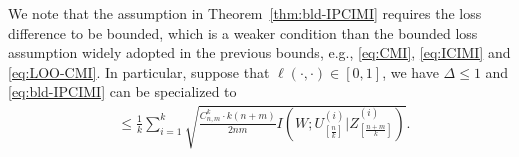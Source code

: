 \documentclass[onecolumn,romanappendices,10pt]{IEEEtran}
\newtheorem{remark}{Remark}
\newcommand{\EE}{{\mathbb{E}}}
\DeclareMathOperator{\gen}{\overline{gen}}
\begin{document}
	
	We note that the assumption in Theorem~\ref{thm:bld-IPCIMI} requires the loss difference to be bounded, which is a weaker condition than the bounded loss assumption widely adopted in the previous bounds, e.g., \eqref{eq:CMI}, \eqref{eq:ICIMI} and \eqref{eq:LOO-CMI}. In particular, suppose that $\ell(\cdot, \cdot) \in [0,1]$, we have $\Delta \leq 1$ and \eqref{eq:bld-IPCIMI} can be specialized to
	\begin{equation}
		\begin{aligned}
			\gen \leq \frac{1}{k} \sum_{i=1}^{k} \sqrt{\frac{C^k_{n,m} \cdot k(n+m)}{2nm} I\left( W; U^{(i)}_{[\frac{n}{k}]} | \hat{Z}^{(i)}_{[\frac{n+m}{k}]} \right)}.
		\end{aligned}\label{eq:IPCIMI}
	\end{equation}
	
\end{document}

